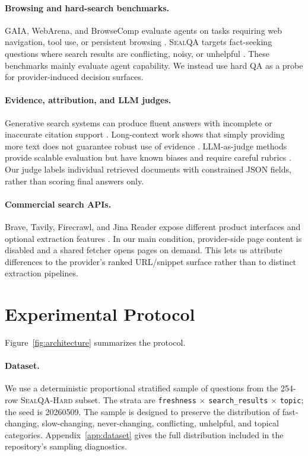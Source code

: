 \paragraph{Browsing and hard-search benchmarks.}
GAIA, WebArena, and BrowseComp evaluate agents on tasks requiring web navigation, tool use, or persistent browsing \citep{mialon2023gaia,zhou2023webarena,wei2025browsecomp}. \textsc{SealQA} targets fact-seeking questions where search results are conflicting, noisy, or unhelpful \citep{pham2025sealqa}. These benchmarks mainly evaluate agent capability. We instead use hard QA as a probe for provider-induced decision surfaces.

\paragraph{Evidence, attribution, and LLM judges.}
Generative search systems can produce fluent answers with incomplete or inaccurate citation support \citep{liu2023verifiability,yue2023automatic}. Long-context work shows that simply providing more text does not guarantee robust use of evidence \citep{liu2024lost}. LLM-as-judge methods provide scalable evaluation but have known biases and require careful rubrics \citep{zheng2023judging,liu2023geval}. Our judge labels individual retrieved documents with constrained JSON fields, rather than scoring final answers only.

\paragraph{Commercial search APIs.}
Brave, Tavily, Firecrawl, and Jina Reader expose different product interfaces and optional extraction features \citep{bravesearch-docs,tavily-docs,firecrawl-docs,jina-reader}. In our main condition, provider-side page content is disabled and a shared fetcher opens pages on demand. This lets us attribute differences to the provider's ranked URL/snippet surface rather than to distinct extraction pipelines.

\section{Experimental Protocol}
\label{sec:protocol}

Figure~\ref{fig:architecture} summarizes the protocol.

\paragraph{Dataset.}
We use a deterministic proportional stratified sample of \NQueries{} questions from the 254-row \textsc{SealQA-Hard} subset. The strata are \texttt{freshness} $\times$ \texttt{search\_results} $\times$ \texttt{topic}; the seed is 20260509. The sample is designed to preserve the distribution of fast-changing, slow-changing, never-changing, conflicting, unhelpful, and topical categories. Appendix~\ref{app:dataset} gives the full distribution included in the repository's sampling diagnostics.

